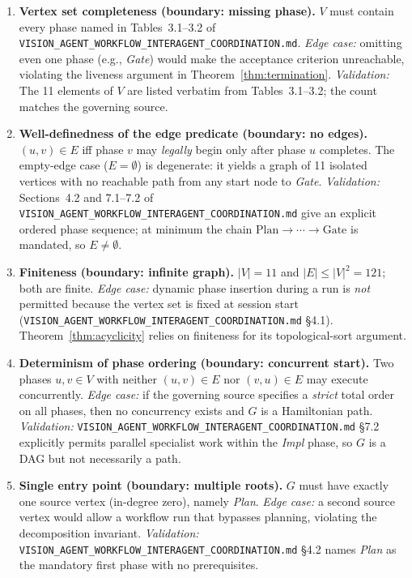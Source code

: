 \documentclass[12pt]{article}
\theoremstyle{definition}
\newcommand{\code}[1]{\texttt{#1}}
\newcommand{\VisionFlow}{\code{VISION\_AGENT\_\allowbreak WORKFLOW\_\allowbreak INTERAGENT\_\allowbreak COORDINATION.md}}
\begin{document}
\begin{enumerate}[label=\textbf{W\arabic*.}, leftmargin=*, widest=W9]

  \item \textbf{Vertex set completeness (boundary: missing phase).}
        $V$ must contain every phase named in Tables~3.1--3.2 of
        \VisionFlow{}.
        \emph{Edge case:} omitting even one phase (e.g., \textit{Gate})
        would make the acceptance criterion unreachable, violating the
        liveness argument in Theorem~\ref{thm:termination}.
        \emph{Validation:} The 11 elements of $V$ are listed verbatim
        from Tables~3.1--3.2; the count matches the governing source.

  \item \textbf{Well-definedness of the edge predicate (boundary: no
        edges).}
        $(u,v)\in E$ iff phase $v$ may \emph{legally} begin only after
        phase $u$ completes.  The empty-edge case ($E = \emptyset$) is
        degenerate: it yields a graph of 11 isolated vertices with no
        reachable path from any start node to \textit{Gate}.
        \emph{Validation:} Sections~4.2 and 7.1--7.2 of \VisionFlow{}
        give an explicit ordered phase sequence; at minimum the chain
        $\mathrm{Plan} \to \cdots \to \mathrm{Gate}$ is
        mandated, so $E \neq \emptyset$.

  \item \textbf{Finiteness (boundary: infinite graph).}
        $|V| = 11$ and $|E| \leq |V|^2 = 121$; both are finite.
        \emph{Edge case:} dynamic phase insertion during a run is
        \emph{not} permitted because the vertex set is fixed at session
        start (\VisionFlow{} \S4.1).  Theorem~\ref{thm:acyclicity}
        relies on finiteness for its topological-sort argument.

  \item \textbf{Determinism of phase ordering (boundary: concurrent
        start).}
        Two phases $u, v \in V$ with neither $(u,v) \in E$ nor
        $(v,u) \in E$ may execute concurrently.
        \emph{Edge case:} if the governing source specifies a
        \emph{strict} total order on all phases, then no concurrency
        exists and $G$ is a Hamiltonian path.
        \emph{Validation:} \VisionFlow{} \S7.2 explicitly permits
        parallel specialist work within the \textit{Impl} phase, so
        $G$ is a DAG but not necessarily a path.

  \item \textbf{Single entry point (boundary: multiple roots).}
        $G$ must have exactly one source vertex (in-degree zero),
        namely \textit{Plan}.
        \emph{Edge case:} a second source vertex would allow a workflow
        run that bypasses planning, violating the decomposition
        invariant.
        \emph{Validation:} \VisionFlow{} \S4.2 names \textit{Plan} as
        the mandatory first phase with no prerequisites.


\end{enumerate}
\end{document}

